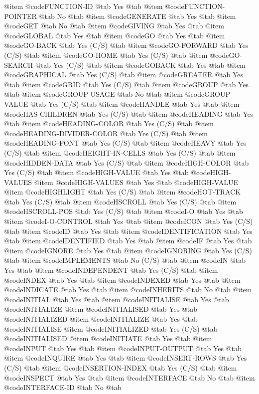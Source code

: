 @item @code{FUNCTION-ID} @tab Yes @tab
@item @code{FUNCTION-POINTER} @tab No @tab
@item @code{GENERATE} @tab Yes @tab
@item @code{GET} @tab No @tab
@item @code{GIVING} @tab Yes @tab
@item @code{GLOBAL} @tab Yes @tab
@item @code{GO} @tab Yes @tab
@item @code{GO-BACK} @tab Yes	(C/S) @tab
@item @code{GO-FORWARD} @tab Yes	(C/S) @tab
@item @code{GO-HOME} @tab Yes	(C/S) @tab
@item @code{GO-SEARCH} @tab Yes	(C/S) @tab
@item @code{GOBACK} @tab Yes @tab
@item @code{GRAPHICAL} @tab Yes	(C/S) @tab
@item @code{GREATER} @tab Yes @tab
@item @code{GRID} @tab Yes	(C/S) @tab
@item @code{GROUP} @tab Yes @tab
@item @code{GROUP-USAGE} @tab No @tab
@item @code{GROUP-VALUE} @tab Yes	(C/S) @tab
@item @code{HANDLE} @tab Yes @tab
@item @code{HAS-CHILDREN} @tab Yes	(C/S) @tab
@item @code{HEADING} @tab Yes @tab
@item @code{HEADING-COLOR} @tab Yes	(C/S) @tab
@item @code{HEADING-DIVIDER-COLOR} @tab Yes	(C/S) @tab
@item @code{HEADING-FONT} @tab Yes	(C/S) @tab
@item @code{HEAVY} @tab Yes	(C/S) @tab
@item @code{HEIGHT-IN-CELLS} @tab Yes	(C/S) @tab
@item @code{HIDDEN-DATA} @tab Yes	(C/S) @tab
@item @code{HIGH-COLOR} @tab Yes	(C/S) @tab
@item @code{HIGH-VALUE} @tab Yes @tab @code{HIGH-VALUES}
@item @code{HIGH-VALUES} @tab Yes @tab @code{HIGH-VALUE}
@item @code{HIGHLIGHT} @tab Yes	(C/S) @tab
@item @code{HOT-TRACK} @tab Yes	(C/S) @tab
@item @code{HSCROLL} @tab Yes	(C/S) @tab
@item @code{HSCROLL-POS} @tab Yes	(C/S) @tab
@item @code{I-O} @tab Yes @tab
@item @code{I-O-CONTROL} @tab Yes @tab
@item @code{ICON} @tab Yes	(C/S) @tab
@item @code{ID} @tab Yes @tab
@item @code{IDENTIFICATION} @tab Yes @tab
@item @code{IDENTIFIED} @tab Yes @tab
@item @code{IF} @tab Yes @tab
@item @code{IGNORE} @tab Yes @tab
@item @code{IGNORING} @tab Yes	(C/S) @tab
@item @code{IMPLEMENTS} @tab No	(C/S) @tab
@item @code{IN} @tab Yes @tab
@item @code{INDEPENDENT} @tab Yes	(C/S) @tab
@item @code{INDEX} @tab Yes @tab
@item @code{INDEXED} @tab Yes @tab
@item @code{INDICATE} @tab Yes @tab
@item @code{INHERITS} @tab No @tab
@item @code{INITIAL} @tab Yes @tab
@item @code{INITIALISE} @tab Yes @tab @code{INITIALIZE}
@item @code{INITIALISED} @tab Yes @tab @code{INITIALIZED}
@item @code{INITIALIZE} @tab Yes @tab @code{INITIALISE}
@item @code{INITIALIZED} @tab Yes	(C/S) @tab @code{INITIALISED}
@item @code{INITIATE} @tab Yes @tab
@item @code{INPUT} @tab Yes @tab
@item @code{INPUT-OUTPUT} @tab Yes @tab
@item @code{INQUIRE} @tab Yes @tab
@item @code{INSERT-ROWS} @tab Yes	(C/S) @tab
@item @code{INSERTION-INDEX} @tab Yes	(C/S) @tab
@item @code{INSPECT} @tab Yes @tab
@item @code{INTERFACE} @tab No @tab
@item @code{INTERFACE-ID} @tab No @tab
